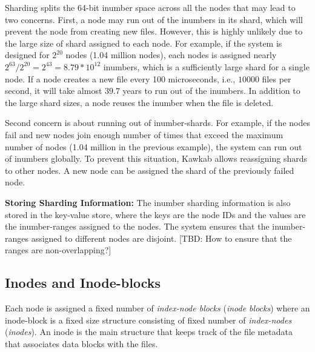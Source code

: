 \documentclass[]{article}
\newcommand{\subtopic}[1]{\vspace{1.5pt} \noindent \textbf{#1}}
\begin{document}
Sharding splits the 64-bit inumber space across all the nodes that may lead to
two concerns. First, a node may run out of the inumbers in its shard, which
will prevent the node from creating new files.  However, this is highly
unlikely due to the large size of shard assigned to each node. For example, if
the system is designed for $2^{20}$ nodes (1.04 million nodes), each nodes is
assigned nearly $2^{63} / 2^{20} = 2^{43} = 8.79 * 10^{12}$ inumbers, which is a
sufficiently large shard for a single node. If a node creates a new file
every 100 microseconds, i.e., $10000$ files per second, it will take almost
$39.7$ years to run out of the inumbers. In addition to the large shard
sizes, a node reuses the inumber when the file is deleted.

Second concern is about running out of inumber-shards. For example, if
the nodes fail and new nodes join enough number of times that exceed the maximum
number of nodes (1.04 million in the previous example), the system can run out
of inumbers globally. To prevent this situation, Kawkab allows reassigning
shards to other nodes. A new node can be assigned the shard of the previously
failed node.


\subtopic{Storing Sharding Information:}
The inumber sharding information is also stored in the key-value store, where the
keys are the node IDs and the values are the inumber-ranges assigned to the
nodes. The system ensures that the inumber-ranges assigned to different nodes
are disjoint. [TBD: How to ensure that the ranges are non-overlapping?]


%

\subsection{Inodes and Inode-blocks} 

Each node is assigned a fixed number of \textit{index-node blocks}
(\textit{inode blocks})  where an inode-block is a fixed size structure
consisting of fixed number of \textit{index-nodes} (\textit{inodes}).  An inode
is the main structure that keeps track of the file metadata that associates
data blocks with the files.
\end{document}

